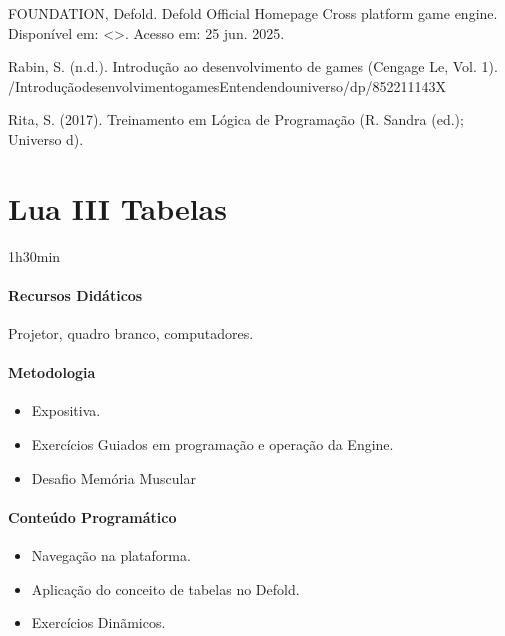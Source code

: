 \documentclass[letterpaper,10pt,brazil]{sphinxmanual}
\begin{document}
\sphinxAtStartPar
FOUNDATION, Defold. Defold \sphinxhyphen{} Official Homepage \sphinxhyphen{} Cross platform game engine.
Disponível em: \textless{}\textgreater{}. Acesso em: 25 jun. 2025.

\sphinxAtStartPar
Rabin, S. (n.d.). Introdução ao desenvolvimento de games (Cengage Le, Vol. 1).
/Introdução\sphinxhyphen{}desenvolvimento\sphinxhyphen{}games\sphinxhyphen{}Entendendo\sphinxhyphen{}universo/dp/852211143X

\sphinxAtStartPar
Rita, S. (2017). Treinamento em Lógica de Programação (R. Sandra (ed.); Universo d).

\sphinxstepscope


\chapter{Lua III \sphinxhyphen{} Tabelas}
\label{\detokenize{modelo_aula_05:lua-iii-tabelas}}\label{\detokenize{modelo_aula_05::doc}}
\sphinxAtStartPar
{} 1h30min
\subsubsection*{Recursos Didáticos}

\sphinxAtStartPar
Projetor, quadro branco, computadores.
\subsubsection*{Metodologia}
\begin{itemize}
\item {} 
\sphinxAtStartPar
Expositiva.

\item {} 
\sphinxAtStartPar
Exercícios Guiados em programação e operação da Engine.

\item {} 
\sphinxAtStartPar
Desafio \sphinxhyphen{} Memória Muscular

\end{itemize}
\subsubsection*{Conteúdo Programático}
\begin{itemize}
\item {} 
\sphinxAtStartPar
Navegação na plataforma.

\item {} 
\sphinxAtStartPar
Aplicação do conceito de tabelas no Defold.

\item {} 
\sphinxAtStartPar
Exercícios Dinãmicos.

\end{itemize}
\end{document}
